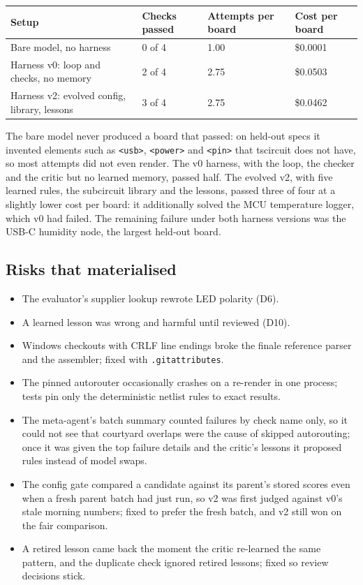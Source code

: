 \documentclass[11pt,a4paper]{article}
\newcommand{\code}[1]{\texttt{#1}}
\begin{document}
\begin{center}
\begin{tabular}{@{}L{6.5cm}L{2.6cm}L{2.6cm}L{2.6cm}@{}}
\toprule
Setup & Checks passed & Attempts per board & Cost per board \\
\midrule
Bare model, no harness & 0 of 4 & 1.00 & \$0.0001 \\
Harness v0: loop and checks, no memory & 2 of 4 & 2.75 & \$0.0503 \\
Harness v2: evolved config, library, lessons & 3 of 4 & 2.75 & \$0.0462 \\
\bottomrule
\end{tabular}
\end{center}

The bare model never produced a board that passed: on held-out specs it invented elements such as \code{<usb>}, \code{<power>} and \code{<pin>} that tscircuit does not have, so most attempts did not even render. The v0 harness, with the loop, the checker and the critic but no learned memory, passed half. The evolved v2, with five learned rules, the subcircuit library and the lessons, passed three of four at a slightly lower cost per board: it additionally solved the MCU temperature logger, which v0 had failed. The remaining failure under both harness versions was the USB-C humidity node, the largest held-out board.

\subsection{Risks that materialised}

\begin{itemize}
  \item The evaluator's supplier lookup rewrote LED polarity (D6).
  \item A learned lesson was wrong and harmful until reviewed (D10).
  \item Windows checkouts with CRLF line endings broke the finale reference parser and the assembler; fixed with \code{.gitattributes}.
  \item The pinned autorouter occasionally crashes on a re-render in one process; tests pin only the deterministic netlist rules to exact results.
  \item The meta-agent's batch summary counted failures by check name only, so it could not see that courtyard overlaps were the cause of skipped autorouting; once it was given the top failure details and the critic's lessons it proposed rules instead of model swaps.
  \item The config gate compared a candidate against its parent's stored scores even when a fresh parent batch had just run, so v2 was first judged against v0's stale morning numbers; fixed to prefer the fresh batch, and v2 still won on the fair comparison.
  \item A retired lesson came back the moment the critic re-learned the same pattern, and the duplicate check ignored retired lessons; fixed so review decisions stick.
\end{itemize}
\end{document}
